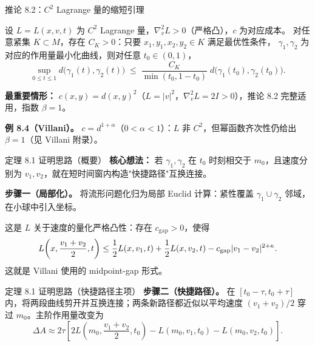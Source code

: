 \begin{frame}{推论 8.2：$C^{2}$ Lagrange 量的缩短引理}

  设 $L=L(x,v,t)$ 为 $C^{2}$ Lagrange 量，$\nabla_{v}^{2}L>0$（严格凸），$c$ 为对应成本。
  对任意紧集 $K\subset M$，存在 $C_{K}>0$：只要 $x_{1},y_{1},x_{2},y_{2}\in K$ 满足最优性条件，
  $\gamma_{1},\gamma_{2}$ 为对应的作用量最小化曲线，则对任意 $t_{0}\in(0,1)$，
  \[
    \sup_{0\le t\le 1}d\!\bigl(\gamma_{1}(t),\gamma_{2}(t)\bigr)
    \;\le\; \frac{C_{K}}{\min(t_{0},1-t_{0})}\;d\!\bigl(\gamma_{1}(t_{0}),\gamma_{2}(t_{0})\bigr).
  \]

  \textbf{最重要情形：} $c(x,y)=d(x,y)^{2}$（$L=|v|^{2}$，$\nabla_{v}^{2}L=2I>0$），推论 8.2 完整适用，指数 $\beta=1$。

  \textbf{例 8.4（Villani）。} $c=d^{1+\alpha}$（$0<\alpha<1$）：$L$ 非 $C^2$，但幂函数齐次性仍给出 $\beta=1$（见 Villani 附录）。


\end{frame}

\begin{frame}{定理 8.1 证明思路（概要）}
  \textbf{核心想法：} 若 $\gamma_{1},\gamma_{2}$ 在 $t_{0}$ 时刻相交于 $m_{0}$，且速度分别为 $v_{1},v_{2}$，就在短时间窗内构造"快捷路径"互换连接。\proofskipnote

  \textbf{步骤一（局部化）。} 将流形问题化归为局部 Euclid 计算：紧性覆盖 $\gamma_{1}\cup\gamma_{2}$ 邻域，在小球中引入坐标。

  这是 $L$ 关于速度的量化严格凸性：存在 $c_{\mathrm{gap}}>0$，使得
  \[
    L\!\left(x,\frac{v_{1}+v_{2}}{2},t\right)
    \le \frac{1}{2}L(x,v_{1},t)+\frac{1}{2}L(x,v_{2},t)
    -c_{\mathrm{gap}}\lvert v_{1}-v_{2}\rvert^{2+\kappa}.
  \]
  这就是 Villani 使用的 midpoint-gap 形式。

\end{frame}

\begin{frame}{定理 8.1 证明思路（快捷路径主项）}
  \textbf{步骤二（快捷路径）。}\proofskipnote
  在 $[t_{0}-\tau,t_{0}+\tau]$ 内，将两段曲线剪开并互换连接；两条新路径都近似以平均速度 $(v_{1}+v_{2})/2$ 穿过 $m_{0}$。主阶作用量改变为
  \[
    \Delta A \approx
    2\tau\!\left[2L\!\left(m_{0},\frac{v_{1}+v_{2}}{2},t_{0}\right)
    -L(m_{0},v_{1},t_{0})-L(m_{0},v_{2},t_{0})\right].
  \]

\end{frame}

